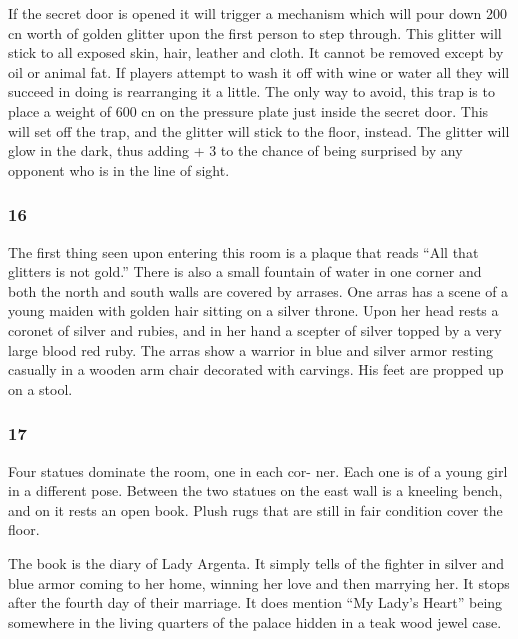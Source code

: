 \documentclass[palace_of_the_silver_princess]{subfiles}
\begin{document}
If the secret door is opened it will trigger a mechanism which will pour
down 200 cn worth of golden glitter upon the first person to step
through. This glitter will stick to all exposed skin, hair, leather and
cloth. It cannot be removed except by oil or animal fat. If players
attempt to wash it off with wine or water all they will succeed in doing
is rearranging it a little. The only way to avoid, this trap is to place
a weight of 600 cn on the pressure plate just inside the secret door.
This will set off the trap, and the glitter will stick to the floor,
instead. The glitter will glow in the dark, thus adding + 3 to the
chance of being surprised by any opponent who is in the line of sight.
    
\subsubsection{16}
\begin{quotebox}
    The first thing seen upon entering this room is a plaque that reads
    “All that glitters is not gold.” There is also a small fountain of
    water in one corner and both the north and south walls are covered
    by arrases. One arras has a scene of a young maiden with golden hair
    sitting on a silver throne. Upon her head rests a coronet of silver
    and rubies, and in her hand a scepter of silver topped by a very
    large blood red ruby. The arras show a warrior in blue and silver
    armor resting casually in a wooden arm chair decorated with
    carvings. His feet are propped up on a stool.
\end{quotebox}

\subsubsection{17}
\begin{quotebox}
    Four statues dominate the room, one in each cor- ner. Each one is of
    a young girl in a different pose. Between the two statues on the
    east wall is a kneeling bench, and on it rests an open book. Plush
    rugs that are still in fair condition cover the floor.
\end{quotebox}

The book is the diary of Lady Argenta. It simply tells of the fighter in
silver and blue armor coming to her home, winning her love and then
marrying her. It stops after the fourth day of their marriage. It does
mention “My Lady’s Heart” being somewhere in the living quarters of the
palace hidden in a teak wood jewel case.
\end{document}
